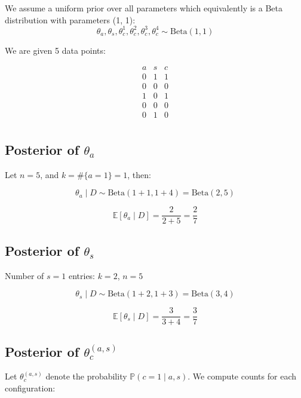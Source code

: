 \documentclass[11pt]{article}
\begin{document}
We assume a uniform prior over all parameters which equivalently is a Beta distribution with parameters (1, 1):
\[
\theta_a, \theta_s, \theta_c^1, \theta_c^2, \theta_c^3, \theta_c^4 \sim \text{Beta}(1,1)
\]

We are given 5 data points:

\[
\begin{array}{ccc}
a & s & c \\
\hline
0 & 1 & 1 \\
0 & 0 & 0 \\
1 & 0 & 1 \\
0 & 0 & 0 \\
0 & 1 & 0 \\
\end{array}
\]

\subsection*{Posterior of \(\theta_a\)}

Let \(n = 5\), and \(k = \#\{a=1\} = 1\), then:

\[
\theta_a \mid D \sim \text{Beta}(1 + 1, 1 + 4) = \text{Beta}(2, 5)
\]

\[
\mathbb{E}[\theta_a \mid D] = \frac{2}{2 + 5} = \frac{2}{7}
\]

\subsection*{Posterior of \(\theta_s\)}

Number of \(s = 1\) entries: \(k = 2\), \(n = 5\)

\[
\theta_s \mid D \sim \text{Beta}(1 + 2, 1 + 3) = \text{Beta}(3, 4)
\]

\[
\mathbb{E}[\theta_s \mid D] = \frac{3}{3 + 4} = \frac{3}{7}
\]

\subsection*{Posterior of \(\theta_c^{(a,s)}\)}

Let \(\theta_c^{(a,s)}\) denote the probability \(\mathbb{P}(c = 1 \mid a, s)\). We compute counts for each configuration:
\end{document}
